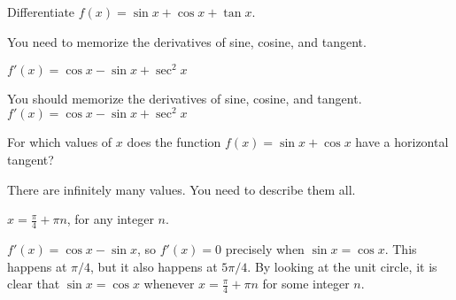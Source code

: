 \subsection*{\Procedural}


\begin{question}
Differentiate $f(x)=\sin x + \cos x +\tan x$.
\end{question}
\begin{hint}
You need to memorize the derivatives of sine, cosine, and tangent.
\end{hint}
\begin{answer}
$f'(x)=\cos x - \sin x + \sec^2 x$
\end{answer}
\begin{solution}
You should memorize the derivatives of sine, cosine, and tangent.\\
$f'(x)=\cos x - \sin x + \sec^2 x$
\end{solution}


\begin{Mquestion}
For which values of $x$ does the function $f(x)=\sin x + \cos x$ have a horizontal tangent?
\end{Mquestion}
\begin{hint}
There are infinitely many values. You need to describe them all.
\end{hint}
\begin{answer}
$x=\frac{\pi}{4}+\pi n$, for any integer $n$.
\end{answer}
\begin{solution}
$f'(x)=\cos x - \sin x$, so $f'(x)=0$ precisely when $\sin x = \cos x$. This happens at $\pi/4$, but it also happens at $5\pi/4$. By looking at the unit circle, it is clear that $\sin x = \cos x$ whenever $x = \frac{\pi}{4}+\pi n$ for some integer $n$.
\begin{center}
\end{center}
\end{solution}


